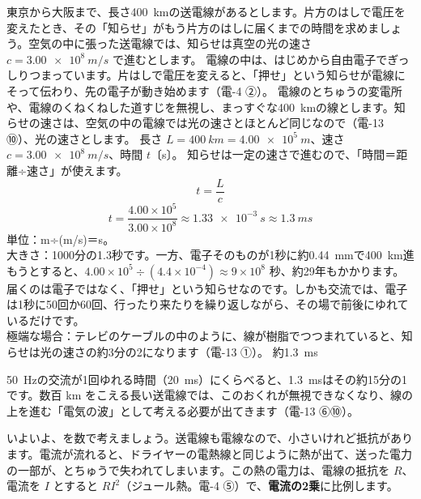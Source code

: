 \begin{phreidai}\label{ph:電-0:ex2}
東京から大阪まで、長さ\qty{400}{km}の送電線があるとします。片方のはしで電圧を変えたとき、その「知らせ」がもう片方のはしに届くまでの時間を求めましょう。空気の中に張った送電線では、知らせは真空の光の速さ $c=\qty{3.00e8}{m/s}$ で進むとします。
\phbamen
電線の中は、はじめから自由電子でぎっしりつまっています。片はしで電圧を変えると、「押せ」という知らせが電線にそって伝わり、先の電子が動き始めます（電-4 ②）。
\phmushi
電線のとちゅうの変電所や、電線のくねくねした道すじを無視し、まっすぐな\qty{400}{km}の線とします。知らせの速さは、空気の中の電線では光の速さとほとんど同じなので（電-13 ⑩）、光の速さとします。
\phzu
長さ $L=\qty{400}{km}=\qty{4.00e5}{m}$、速さ $c=\qty{3.00e8}{m/s}$、時間 $t$〔s〕。
\phriyu
知らせは一定の速さで進むので、「時間＝距離÷速さ」が使えます。
\phtateru
\[t=\frac{L}{c}\]
\phtoku
\[t=\frac{4.00\times10^5}{3.00\times10^8}\approx\qty{1.33e-3}{s}\approx\qty{1.3}{ms}\]
\phtashikame
単位：m÷(m/s)＝s。\\
大きさ：1000分の1.3秒です。一方、電子そのものが1秒に約\qty{0.44}{mm}で\qty{400}{km}進もうとすると、$4.00\times10^5\div(4.4\times10^{-4})\approx9\times10^8$ 秒、約29年もかかります。届くのは電子ではなく、「押せ」という知らせなのです。しかも交流では、電子は1秒に50回か60回、行ったり来たりを繰り返しながら、その場で前後にゆれているだけです。\\
極端な場合：テレビのケーブルの中のように、線が樹脂でつつまれていると、知らせは光の速さの約3分の2になります（電-13 ①）。
\kotae 約\qty{1.3}{ms}
\end{phreidai}
\noindent \qty{50}{Hz}の交流が1回ゆれる時間（\qty{20}{ms}）にくらべると、\qty{1.3}{ms}はその約15分の1です。数百 km をこえる長い送電線では、このおくれが無視できなくなり、線の上を進む「電気の波」として考える必要が出てきます（電-13 ⑥⑩）。

\leavevmode\label{ph:電-0:sec4}いよいよ、\bkhatenaref を数で考えましょう。送電線も電線なので、小さいけれど抵抗があります。電流が流れると、ドライヤーの電熱線と同じように熱が出て、送った電力の一部が、とちゅうで失われてしまいます。この熱の電力は、電線の抵抗を $R$、電流を $I$ とすると $RI^2$（ジュール熱。電-4 ⑤）で、\textbf{電流の2乗}に比例します。

